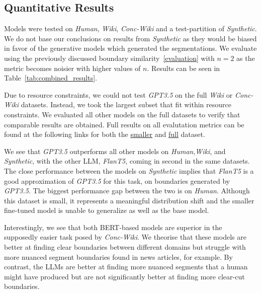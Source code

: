 
\subsection{Quantitative Results}

Models were tested on \emph{Human}, \emph{Wiki}, \emph{Conc-Wiki} and a test-partition of \emph{Synthetic}. We do not base our conclusions on results from \emph{Synthetic} as they would be biased in favor of the generative models which generated the segmentations. We evaluate using the previously discussed boundary similarity~\ref{evaluation} with $n=2$ as the metric becomes noisier with higher values of $n$. Results can be seen in Table~\ref{tab:combined_results}.

Due to resource constraints, we could not test \emph{GPT3.5} on the full \emph{Wiki} or \emph{Conc-Wiki} datasets. Instead, we took the largest subset that fit within resource constraints. We evaluated all other models on the full datasets to verify that comparable results are obtained. Full results on all evalutation metrics can be found at the following links for both the \href{https://docs.google.com/spreadsheets/d/15CJhNuioTS9L13tXsGfaG54igEF1HB6Os_mnR0k4P-I/edit?usp=sharing}{smaller} and \href{https://docs.google.com/spreadsheets/d/1UorM9wHrSOVURJ5djldZ6y3kCjNMNcQSFEBOALo-HgI/edit?usp=sharing}{full} dataset.

We see that \emph{GPT3.5} outperforms all other models on \emph{Human},\emph{Wiki}, and \emph{Synthetic}, with the other LLM, \emph{FlanT5}, coming in second in the same datasets. The close performance between the models on \emph{Synthetic} implies that \emph{FlanT5} is a good approximation of \emph{GPT3.5} for this task, on boundaries generated by \emph{GPT3.5}. The biggest performance gap between the two is on \emph{Human}. Although this dataset is small, it represents a meaningful distribution shift and the smaller fine-tuned model is unable to generalize as well as the base model.

Interestingly, we see that both BERT-based models are superior in the supposedly easier task posed by \emph{Conc-Wiki}. We theorise that these models are better at finding clear boundaries between different domains but struggle with more nuanced segment boundaries found in news articles, for example. By contrast, the LLMs are better at finding more nuanced segments that a human might have produced but are not significantly better at finding more clear-cut boundaries.

